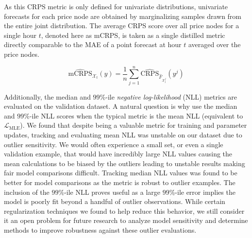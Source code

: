 As this CRPS metric is only defined for univariate distributions, univariate forecasts for each price node are obtained
by marginalizing samples drawn from the entire joint distribution.
The average CRPS score over all price nodes for a single hour $t$, denoted here as mCRPS, is taken as a
single distilled metric directly comparable to the MAE of a point forecast at hour $t$ averaged over the price nodes.

\begin{equation}
    \widehat{\text{mCRPS}}_{\mathcal{X}_t}(y) = \frac{1}{n} \sum_{j=1}^n \widehat{\text{CRPS}}_{\hat{F}_{\mathcal{X}^j_t}}(y^j)
    \label{eq:mcrps}
\end{equation}

Additionally, the median and $99\%$-ile \textit{negative log-likelihood} (NLL) metrics are evaluated on the validation dataset.
A natural question is why use the median and $99\%$-ile NLL scores when the typical metric is the mean NLL
(equivalent to $\mathcal{L}_{\text{MLE}}$).
We found that despite being a valuable metric for training and parameter updates, tracking and evaluating mean NLL was
unstable on our dataset due to outlier sensitivity.
We would often experience a small set, or even a single validation example, that would have incredibly large NLL
values causing the mean calculations to be biased by the outliers leading to unstable results making fair model comparisons
difficult.
Tracking median NLL values was found to be better for model comparisons as the metric is robust to outlier examples.
The inclusion of the $99\%$-ile NLL proves useful as a large $99\%$-ile error implies
the model is poorly fit beyond a handful of outlier observations.
While certain regularization techniques we found to help reduce this behavior, we still consider it an open problem for
future research to analyze model sensitivity and determine methods to improve robustness against these outlier evaluations.
